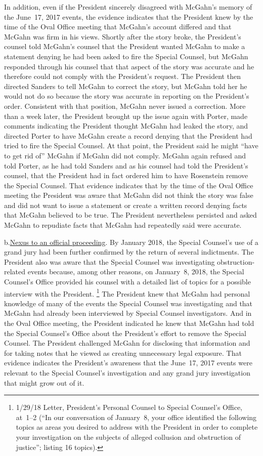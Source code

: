 In addition, even if the President sincerely disagreed with McGahn's memory of the June~17, 2017 events, the evidence indicates that the President knew by the time of the Oval Office
meeting that McGahn's account differed and that McGahn was firm in his views.
Shortly after the story broke, the President's counsel told McGahn's counsel that the President wanted McGahn to make a statement denying he had been asked to fire the Special Counsel, but McGahn responded through his counsel that that aspect of the story was accurate and he therefore could not comply with the President's request.
The President then directed Sanders to tell McGahn to correct the story, but McGahn told her he would not do so because the story was accurate in reporting on the President's order.
Consistent with that position, McGahn never issued a correction.
More than a week later, the President brought up the issue again with Porter, made comments indicating the President thought McGahn had leaked the story, and directed Porter to have McGahn create a record denying that the President had tried to fire the Special Counsel.
At that point, the President said he might ``have to get rid of\thinspace'' McGahn if McGahn did not comply.
McGahn again refused and told Porter, as he had told Sanders and as his counsel had told the President's counsel, that the President had in fact ordered him to have Rosenstein remove the Special Counsel.
That evidence indicates that by the time of the Oval Office meeting the President was aware that McGahn did not think the story was false and did not want to issue a statement or create a written record denying facts that McGahn believed to be true.
The President nevertheless persisted and asked McGahn to repudiate facts that McGahn had repeatedly said were accurate.

b.\qquad\underline{Nexus to an official proceeding}.
By January 2018, the Special Counsel's use of a grand jury had been further confirmed by the return of several indictments.
The President also was aware that the Special Counsel was investigating obstruction-related events because, among other reasons, on January~8, 2018, the Special Counsel's Office provided his counsel with a detailed list of topics for a possible interview with the President.%
\footnote{1/29/18 Letter, President's Personal Counsel to Special Counsel's Office, at~1--2 (``In our conversation of January~8, your office identified the following topics as areas you desired to address with the President in order to complete your investigation on the subjects of alleged collusion and obstruction of justice'';
listing 16 topics).}
The President knew that McGahn had personal knowledge of many of the events the Special Counsel was investigating and that McGahn had already been interviewed by Special Counsel investigators.
And in the Oval Office meeting, the President indicated he knew that McGahn had told the Special Counsel's Office about the President's effort to remove the Special Counsel.
The President challenged McGahn for disclosing that information and for taking notes that he viewed as creating unnecessary legal exposure.
That evidence indicates the President's awareness that the June~17, 2017 events were relevant to the Special Counsel's investigation and any grand jury investigation that might grow out of it.

